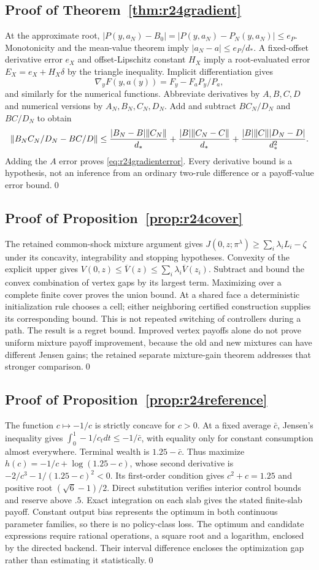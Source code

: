 \subsection{Proof of Theorem~\ref{thm:r24gradient}}
At the approximate root, $|P(y,a_N)-B_0|=|P(y,a_N)-P_N(y,a_N)|\leq e_P$. Monotonicity and the mean-value theorem imply $|a_N-a|\leq e_P/d_*$. A fixed-offset derivative error $e_X$ and offset-Lipschitz constant $H_X$ imply a root-evaluated error $E_X=e_X+H_X\delta$ by the triangle inequality. Implicit differentiation gives
\[
 \nabla_y F(y,a(y))=F_y-F_aP_y/P_a,
\]
and similarly for the numerical functions. Abbreviate derivatives by $A,B,C,D$ and numerical versions by $A_N,B_N,C_N,D_N$. Add and subtract $BC_N/D_N$ and $BC/D_N$ to obtain
\[
 \|B_NC_N/D_N-BC/D\|
 \leq {|B_N-B|\|C_N\|\over d_*}
 +{|B|\|C_N-C\|\over d_*}
 +{|B|\|C\||D_N-D|\over d_*^2}.
\]
Adding the $A$ error proves \eqref{eq:r24gradienterror}. Every derivative bound is a hypothesis, not an inference from an ordinary two-rule difference or a payoff-value error bound.\qed

\subsection{Proof of Proposition~\ref{prop:r24cover}}
The retained common-shock mixture argument gives $J(0,z;\pi^\lambda)\geq\sum_i\lambda_iL_i-\zeta$ under its concavity, integrability and stopping hypotheses. Convexity of the explicit upper gives $V(0,z)\leq\overline V(z)\leq\sum_i\lambda_i\overline V(z_i)$. Subtract and bound the convex combination of vertex gaps by its largest term. Maximizing over a complete finite cover proves the union bound. At a shared face a deterministic initialization rule chooses a cell; either neighboring certified construction supplies its corresponding bound. This is not repeated switching of controllers during a path. The result is a regret bound. Improved vertex payoffs alone do not prove uniform mixture payoff improvement, because the old and new mixtures can have different Jensen gains; the retained separate mixture-gain theorem addresses that stronger comparison.\qed

\subsection{Proof of Proposition~\ref{prop:r24reference}}
The function $c\mapsto-1/c$ is strictly concave for $c>0$. At a fixed average $\bar c$, Jensen's inequality gives $\int_0^1-1/c_tdt\leq-1/\bar c$, with equality only for constant consumption almost everywhere. Terminal wealth is $1.25-\bar c$. Thus maximize $h(c)=-1/c+\log(1.25-c)$, whose second derivative is $-2/c^3-1/(1.25-c)^2<0$. Its first-order condition gives $c^2+c=1.25$ and positive root $(\sqrt6-1)/2$. Direct substitution verifies interior control bounds and reserve above $.5$. Exact integration on each slab gives the stated finite-slab payoff. Constant output bias represents the optimum in both continuous parameter families, so there is no policy-class loss. The optimum and candidate expressions require rational operations, a square root and a logarithm, enclosed by the directed backend. Their interval difference encloses the optimization gap rather than estimating it statistically.\qed
